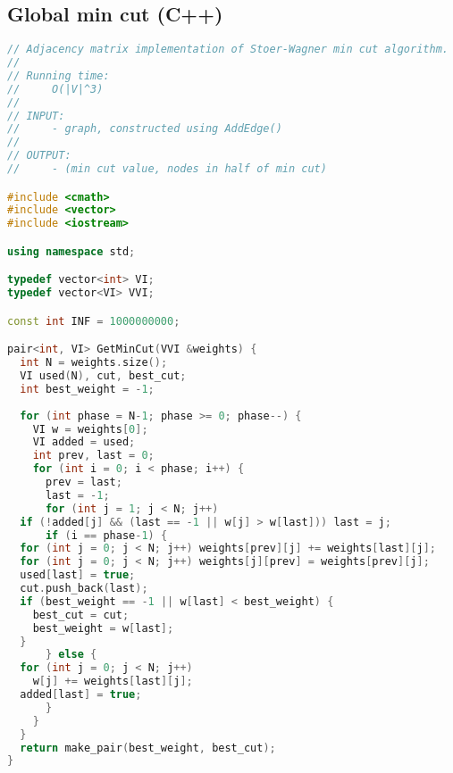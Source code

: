 \subsection{Global min cut (C++)}
\begin{lstlisting}[language=C++]
// Adjacency matrix implementation of Stoer-Wagner min cut algorithm.
//
// Running time:
//     O(|V|^3)
//
// INPUT: 
//     - graph, constructed using AddEdge()
//
// OUTPUT:
//     - (min cut value, nodes in half of min cut)

#include <cmath>
#include <vector>
#include <iostream>

using namespace std;

typedef vector<int> VI;
typedef vector<VI> VVI;

const int INF = 1000000000;

pair<int, VI> GetMinCut(VVI &weights) {
  int N = weights.size();
  VI used(N), cut, best_cut;
  int best_weight = -1;
  
  for (int phase = N-1; phase >= 0; phase--) {
    VI w = weights[0];
    VI added = used;
    int prev, last = 0;
    for (int i = 0; i < phase; i++) {
      prev = last;
      last = -1;
      for (int j = 1; j < N; j++)
  if (!added[j] && (last == -1 || w[j] > w[last])) last = j;
      if (i == phase-1) {
  for (int j = 0; j < N; j++) weights[prev][j] += weights[last][j];
  for (int j = 0; j < N; j++) weights[j][prev] = weights[prev][j];
  used[last] = true;
  cut.push_back(last);
  if (best_weight == -1 || w[last] < best_weight) {
    best_cut = cut;
    best_weight = w[last];
  }
      } else {
  for (int j = 0; j < N; j++)
    w[j] += weights[last][j];
  added[last] = true;
      }
    }
  }
  return make_pair(best_weight, best_cut);
}

\end{lstlisting}
